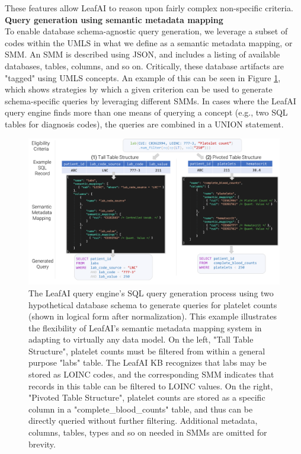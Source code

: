 \documentclass[../main.tex]{subfiles}
\begin{document}
\noindent These features allow LeafAI to reason upon fairly complex non-specific criteria. \\

\noindent \textbf{Query generation using semantic metadata mapping} \\
To enable database schema-agnostic query generation, we leverage a subset of codes within the UMLS in what we define as a semantic metadata mapping, or SMM. An SMM is described using JSON, and includes a listing of available databases, tables, columns, and so on. Critically, these database artifacts are "tagged" using UMLS concepts. An example of this can be seen in Figure \ref{aim2_fig_leafai_smm}, which shows strategies by which a given criterion can be used to generate schema-specific queries by leveraging different SMMs. In cases where the LeafAI query engine finds more than one means of querying a concept (e.g., two SQL tables for diagnosis codes), the queries are combined in a UNION statement.

\begin{figure}[h]
  \includegraphics[scale=0.56]{Figures/Aim2/aim2_leafai_smm.pdf}  
\caption{The LeafAI query engine's SQL query generation process using two hypothetical database schema to generate queries for platelet counts (shown in logical form after normalization). This example illustrates the flexibility of LeafAI's semantic metadata mapping system in adapting to virtually any data model. On the left, "Tall Table Structure", platelet counts must be filtered from within a general purpose "labs" table. The LeafAI KB recognizes that labs may be stored as LOINC codes, and the corresponding SMM indicates that records in this table can be filtered to LOINC values. On the right, "Pivoted Table Structure", platelet counts are stored as a specific column in a "complete\_blood\_counts" table, and thus can be directly queried without further filtering. Additional metadata, columns, tables, types and so on needed in SMMs are omitted for brevity.}
\label{aim2_fig_leafai_smm}
\end{figure}
\end{document}
